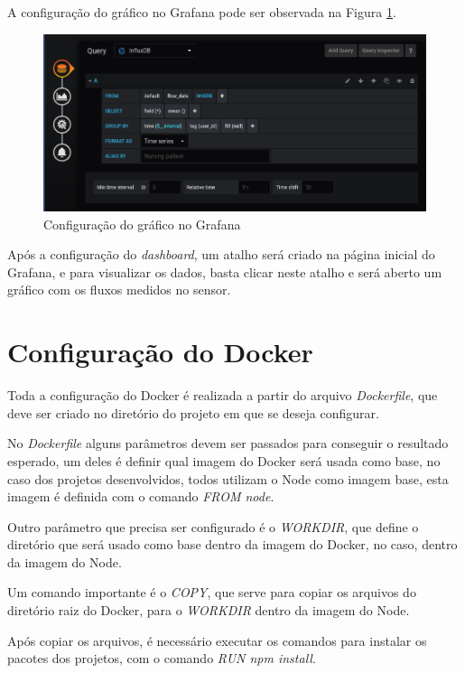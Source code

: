 A configuração do gráfico no Grafana pode ser observada na Figura \ref{fig:grafanaconf}.

\begin{figure}[htbp]
	\centering
	\includegraphics[width=1\linewidth]{figuras/grafanaconf.png}
	\caption{Configuração do gráfico no Grafana}
	\label{fig:grafanaconf}
\end{figure}

Após a configuração do \textit{dashboard}, um atalho será criado na página inicial do Grafana, e para visualizar os dados, basta clicar neste atalho e será aberto um gráfico com os fluxos medidos no sensor.

\section{Configuração do Docker}

Toda a configuração do Docker é realizada a partir do arquivo \textit{Dockerfile}, que deve ser criado no diretório do projeto em que se deseja configurar.

No \textit{Dockerfile} alguns parâmetros devem ser passados para conseguir o resultado esperado, um deles é definir qual imagem do Docker será usada como base, no caso dos projetos desenvolvidos, todos utilizam o Node como imagem base, esta imagem é definida com o comando \textit{FROM node}.

Outro parâmetro que precisa ser configurado é o \textit{WORKDIR}, que define o diretório que será usado como base dentro da imagem do Docker, no caso, dentro da imagem do Node.

Um comando importante é o \textit{COPY}, que serve para copiar os arquivos do diretório raiz do Docker, para o \textit{WORKDIR} dentro da imagem do Node.

Após copiar os arquivos, é necessário executar os comandos para instalar os pacotes dos projetos, com o comando \textit{RUN npm install}.

